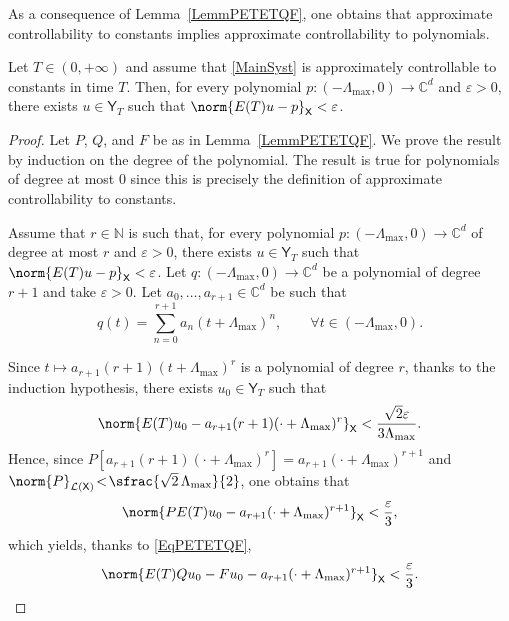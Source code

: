 As a consequence of Lemma~\ref{LemmPETETQF}, one obtains that approximate controllability to constants implies approximate controllability to polynomials.

\begin{lemm}
\label{LemmApproxToPoly}
Let $T \in (0, +\infty)$ and assume that \eqref{MainSyst} is approximately controllable to constants in time $T$. Then, for every polynomial $p: (-\Lambda_{\max}, 0) \to \mathbb C^d$ and $\varepsilon > 0$, there exists $u \in \mathsf Y_T$ such that $\norm{E(T) u - p}_{\mathsf X} < \varepsilon$.
\end{lemm}

\begin{proof}
Let $P$, $Q$, and $F$ be as in Lemma~\ref{LemmPETETQF}. We prove the result by induction on the degree of the polynomial. The result is true for polynomials of degree at most $0$ since this is precisely the definition of approximate controllability to constants.

Assume that $r \in \mathbb N$ is such that, for every polynomial $p: (-\Lambda_{\max}, 0) \to \mathbb C^d$ of degree at most $r$ and $\varepsilon > 0$, there exists $u \in \mathsf Y_T$ such that $\norm{E(T) u - p}_{\mathsf X} < \varepsilon$. Let $q: (-\Lambda_{\max}, 0) \to \mathbb C^d$ be a polynomial of degree $r + 1$ and take $\varepsilon > 0$. Let $a_0, \dots, a_{r+1} \in \mathbb C^d$ be such that
\[q(t) = \sum_{n=0}^{r + 1} a_n (t + \Lambda_{\max})^n, \qquad \forall t \in (-\Lambda_{\max}, 0).\]

Since $t \mapsto a_{r+1} (r+1) (t + \Lambda_{\max})^r$ is a polynomial of degree $r$, thanks to the induction hypothesis, there exists $u_0 \in \mathsf Y_T$ such that
\[
\norm{E(T) u_0 - a_{r+1} (r+1) (\cdot + \Lambda_{\max})^r}_{\mathsf X} < \frac{\sqrt{2}\varepsilon}{3 \Lambda_{\max}}.
\]
Hence, since $P \left[a_{r+1} (r+1) (\cdot + \Lambda_{\max})^r\right] \!=\!a_{r+1} (\cdot + \Lambda_{\max})^{r+1}$ and \hbox{$\norm{P}_{\mathcal L(\mathsf X)}\!<\!\sfrac{\sqrt{2}\, \Lambda_{\max}}{2}$}, one obtains that
\[
\norm{P E(T) u_0 - a_{r+1} (\cdot + \Lambda_{\max})^{r+1}}_{\mathsf X} < \frac{\varepsilon}{3},
\]
which yields, thanks to \eqref{EqPETETQF},
\begin{equation}
\label{EstimU0}
\norm{E(T) Q u_0 - F u_0 - a_{r+1} (\cdot + \Lambda_{\max})^{r+1}}_{\mathsf X} < \frac{\varepsilon}{3}.
\end{equation}


\end{proof}
